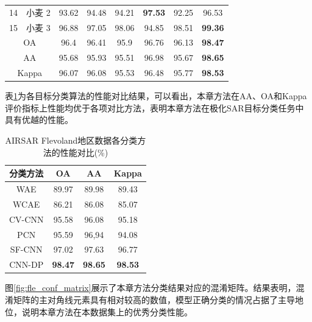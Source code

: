 \begin{table}[ht!]
\begin{tabular}{cccccccc}
        14                        & 小麦 2  & 93.62 & 94.48          & 94.21 & \textbf{97.53} & 92.25          & 96.53          \\
        15                        & 小麦 3  & 96.88 & 97.05          & 98.06 & 94.85          & 98.51          & \textbf{99.36} \\
        \midrule[0.75bp]
        \multicolumn{2}{c}{OA}    & 96.4  & 96.41 & 95.9           & 96.76 & 96.13          & \textbf{98.47}                  \\
        \multicolumn{2}{c}{AA}    & 95.68 & 95.93 & 95.51          & 96.98 & 95.67          & \textbf{98.65}                  \\
        \multicolumn{2}{c}{Kappa} & 96.07 & 96.08 & 95.53          & 96.48 & 95.77          & \textbf{98.53}                  \\
        \bottomrule[1.5bp]
    \end{tabular}
\end{table}

表\ref{tab:fle-diff}为各目标分类算法的性能对比结果，可以看出，本章方法在AA、OA和Kappa评价指标上性能均优于各项对比方法，表明本章方法在极化SAR目标分类任务中具有优越的性能。
\begin{table}[ht!]
    \caption{AIRSAR Flevoland地区数据各分类方法的性能对比(\%)}
    \label{tab:fle-diff}
    \begin{tabular}{cccc}
        \toprule[1.5bp]
        分类方法   & OA             & AA             & Kappa          \\
        \midrule[0.75bp]
        WAE    & 89.97          & 89.98          & 89.43          \\
        WCAE   & 86.21          & 86.08          & 85.07          \\
        CV-CNN & 95.58          & 96.08          & 95.18          \\
        PCN    & 95.59          & 96,94          & 94.08          \\
        SF-CNN & 97.02          & 97.63          & 96.77          \\
        CNN-DP & \textbf{98.47} & \textbf{98.65} & \textbf{98.53} \\
        \bottomrule[1.5bp]
    \end{tabular}
\end{table}

图\ref{fig:fle_conf_matrix}展示了本章方法分类结果对应的混淆矩阵。结果表明，混淆矩阵的主对角线元素具有相对较高的数值，模型正确分类的情况占据了主导地位，说明本章方法在本数据集上的优秀分类性能。

